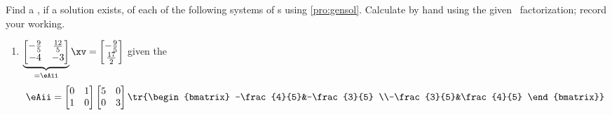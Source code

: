 \begin{exercise} \label{ex:hsledvs} 
Find a , if a solution exists, of each of the following systems of s using \cref{pro:gensol}.
Calculate by hand using the given \svd\ factorization; record your working.
\begin{enumerate}
\item \(\underbrace{\begin{bmatrix} -\frac{9}{5}&\frac{12}{5}
\\-4&-3 \end{bmatrix}}_{=\eAii}\xv
=\begin{bmatrix} -\frac{9}{5}
\\\frac{17}{2} \end{bmatrix}\) given the \svd
\begin{equation*}
\eAii=\begin{bmatrix} 0&1
\\1&0 \end{bmatrix}
\begin{bmatrix} 5&0
\\0&3 \end{bmatrix}
\tr{\begin{bmatrix} -\frac{4}{5}&-\frac{3}{5}
\\-\frac{3}{5}&\frac{4}{5} \end{bmatrix}}
\end{equation*}

\end{enumerate}
\end{exercise}
